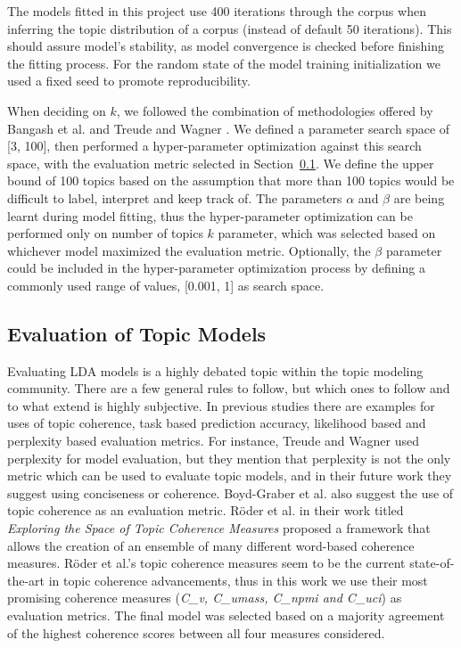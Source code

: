         The models fitted in this project use 400 iterations through the corpus when inferring the topic distribution of a corpus (instead of default 50 iterations). This should assure model's stability, as model convergence is checked before finishing the fitting process. For the random state of the model training initialization we used a fixed seed to promote reproducibility.
        
        \label{sec:hyper-parameter_selection}When deciding on $k$, we followed the combination of methodologies offered by Bangash et al. \cite{bangash2019developers} and Treude and Wagner \cite{treude2019predicting}. We defined a parameter search space of [3, 100], then performed a hyper-parameter optimization against this search space, with the evaluation metric selected in Section~\ref{evaluationMetric}. We define the upper bound of 100 topics based on the assumption that more than 100 topics would be difficult to label, interpret and keep track of. The parameters $\alpha$ and $\beta$ are being learnt during model fitting, thus  the hyper-parameter optimization can be performed only on number of topics $k$ parameter, which was selected based on whichever model maximized the evaluation metric. Optionally, the $\beta$ parameter could be included in the hyper-parameter optimization process by defining a commonly used range of values, [0.001, 1] as search space.
    
    \subsection{Evaluation of Topic Models} \label{evaluationMetric}
    
        Evaluating LDA models is a highly debated topic within the topic modeling community. There are a few general rules to follow, but which ones to follow and to what extend is highly subjective. In previous studies there are examples for uses of topic coherence, task based prediction accuracy, likelihood based and perplexity based evaluation metrics. For instance, Treude and Wagner \cite{treude2019predicting} used perplexity for model evaluation, but they mention that perplexity is not the only metric which can be used to evaluate topic models, and in their future work they suggest using conciseness or coherence. Boyd-Graber et al. \cite{boyd2014care} also suggest the use of topic coherence as an evaluation metric. R{\"o}der et al. \cite{roder2015exploring} in their work titled \textit{Exploring the Space of Topic Coherence Measures} proposed a framework that allows the creation of an ensemble of many different word-based coherence measures. R{\"o}der et al.'s topic coherence measures seem to be the current state-of-the-art in topic coherence advancements, thus in this work we use their most promising coherence measures (\emph{C\_v, C\_umass, C\_npmi and C\_uci}) as evaluation metrics. The final model was selected based on a majority agreement of the highest coherence scores between all four measures considered.
    
